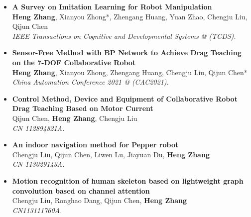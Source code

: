 \documentclass{resume}
\begin{document}
\begin{itemize}
\item \textbf{A Survey on Imitation Learning for Robot Manipulation} \\
  \footnotesize{\textbf{Heng Zhang}, Xianyou Zhong*, Zhengang Huang, Yuan Zhao, Chengju Liu, Qijun Chen} \\
  \footnotesize{\textit{ IEEE Transactions on Cognitive and Developmental Systems @ (TCDS).}}
   
\item \textbf{Sensor-Free Method with BP Network to Achieve Drag Teaching on the 7-DOF Collaborative Robot} \quad [accepted]\\
  \footnotesize{\textbf{Heng Zhang}, Xianyou Zhong, Zhengang Huang, Chengju Liu, Qijun Chen*} \\
  \footnotesize{\textit{ China Automation Conference 2021 @ (CAC2021).}}

\item \textbf{Control Method, Device and Equipment of Collaborative Robot Drag Teaching Based on Motor Current}\quad {}\\
  \footnotesize{Qijun Chen, \textbf{Heng Zhang}, Chengju Liu}\\
  \footnotesize{\textit{ CN 112894821A.}}
  
\item \textbf{An indoor navigation method for Pepper robot}\quad {}\\
  \footnotesize{Chengju Liu, Qijun Chen, Liwen Lu, Jiayuan Du, \textbf{Heng Zhang}}\\
  \footnotesize{\textit{ CN 113029143A.}} 
  
\item \textbf{Motion recognition of human skeleton based on lightweight graph convolution based on channel attention}\quad {}\\
  \footnotesize{ Chengju Liu, Ronghao Dang, Qijun Chen, \textbf{Heng Zhang}}\\
  \footnotesize{\textit{ CN113111760A.}}
  

\end{itemize}
\end{document}
